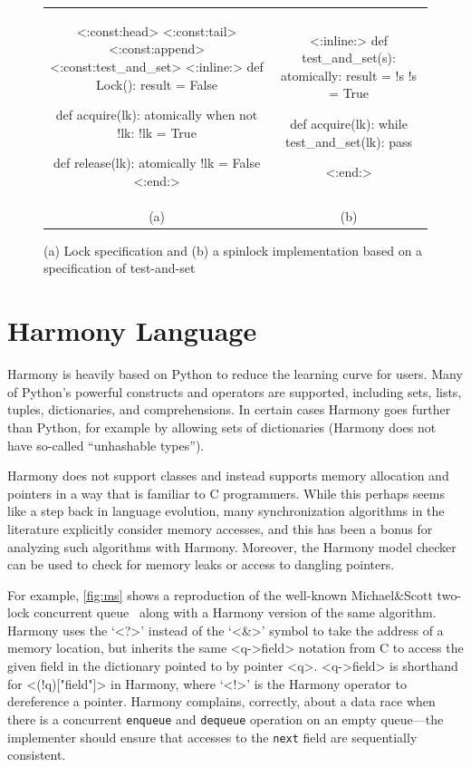\documentclass[twocolumn]{article}
\begin{document}
\begin{figure}[h]
\begin{center}
\begin{tabular}{cc}
{\footnotesize
\begin{tcolorbox}[width=0.45\linewidth]
<{:const:head}>
<{:const:tail}>
<{:const:append}>
<{:const:test_and_set}>
<{:inline:}>
def Lock():
    result = False

def acquire(lk):
    atomically when not !lk:
        !lk = True

def release(lk):
    atomically !lk = False
<{:end:}>
\end{tcolorbox}
}
&
{\footnotesize
\begin{tcolorbox}[width=0.45\linewidth]
<{:inline:}>
def test_and_set(s):
    atomically:
        result = !s
        !s = True

def acquire(lk):
    while test_and_set(lk):
        pass

<{:end:}>
\end{tcolorbox}
}
\\
(a) & (b)
\end{tabular}
\end{center}
\caption{(a) Lock specification and (b) a spinlock implementation based on
a specification of test-and-set}
\label{fig:synch}
\end{figure}

\section{Harmony Language}

Harmony is heavily based on Python to reduce the learning curve for
users.  Many of Python's powerful constructs and operators are
supported, including sets, lists, tuples, dictionaries, and
comprehensions.  In certain cases Harmony goes further than Python,
for example by allowing sets of dictionaries (Harmony does not have
so-called ``unhashable types'').

Harmony does not
support classes and instead supports memory allocation and pointers
in a way that is familiar to C programmers.  While this perhaps
seems like a step back in language evolution, many synchronization
algorithms in the literature explicitly consider memory accesses,
and this has been a bonus for analyzing such algorithms with Harmony.
Moreover, the Harmony model checker can be used to check for memory
leaks or access to dangling pointers.

For example, \autoref{fig:ms} shows a reproduction of the well-known
Michael\&Scott two-lock concurrent queue~\cite{MS96} along with a
Harmony version of the same algorithm.
Harmony uses the `<{?}>' instead of the `<{&}>' symbol to take the address
of a memory location, but inherits the same <{q->field}> notation
from C to access the given field in the dictionary pointed to by
pointer <{q}>.  <{q->field}> is shorthand for <{(!q)["field"]}> in
Harmony, where `<{!}>' is the Harmony operator to dereference a pointer.
Harmony complains, correctly, about a data race when
there is a concurrent \texttt{enqueue} and \texttt{dequeue} operation
on an empty queue---the implementer should ensure that accesses to the
\texttt{next} field are sequentially consistent.
\end{document}
